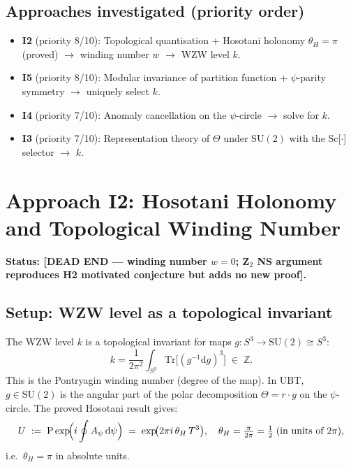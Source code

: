 \documentclass[11pt,a4paper]{article}
\theoremstyle{definition}
\theoremstyle{remark}
\begin{document}
\subsection{Approaches investigated (priority order)}

\begin{itemize}
  \item \textbf{I2} (priority 8/10): Topological quantisation +
    Hosotani holonomy $\theta_H = \pi$ (proved) $\to$ winding number
    $w$ $\to$ WZW level $k$.
  \item \textbf{I5} (priority 8/10): Modular invariance of partition
    function + $\psi$-parity symmetry $\to$ uniquely select $k$.
  \item \textbf{I4} (priority 7/10): Anomaly cancellation on the
    $\psi$-circle $\to$ solve for $k$.
  \item \textbf{I3} (priority 7/10): Representation theory of $\Theta$
    under $\mathrm{SU}(2)$ with the Sc[$\cdot$] selector $\to$ $k$.
\end{itemize}

\section{Approach I2: Hosotani Holonomy and Topological Winding Number}
\label{sec:I2}

\textbf{Status: [DEAD END — winding number $w = 0$; Z$_2$ NS argument
reproduces H2 motivated conjecture but adds no new proof].}

\subsection{Setup: WZW level as a topological invariant}

The WZW level $k$ is a topological invariant for maps
$g : S^3 \to \mathrm{SU}(2) \cong S^3$:
\begin{equation}
  k = \frac{1}{2\pi^2}\int_{S^3}
    \mathrm{Tr}\bigl[(g^{-1}\mathrm{d}g)^3\bigr] \;\in\; \mathbb{Z}.
  \label{eq:k_Pontryagin}
\end{equation}
This is the Pontryagin winding number (degree of the map).
In UBT, $g \in \mathrm{SU}(2)$ is the angular part of the polar
decomposition $\Theta = r\cdot g$ on the $\psi$-circle.
The proved Hosotani result gives:
\begin{equation}
  U \;:=\; \mathrm{P}\exp\!\Bigl(i\oint A_\psi\,\mathrm{d}\psi\Bigr)
  \;=\; \exp\!\bigl(2\pi i\,\theta_H\, T^3\bigr),
  \quad \theta_H = \tfrac{\pi}{2\pi} = \tfrac{1}{2}
  \;\text{(in units of }2\pi),
\end{equation}
i.e.\ $\theta_H = \pi$ in absolute units.
\end{document}
